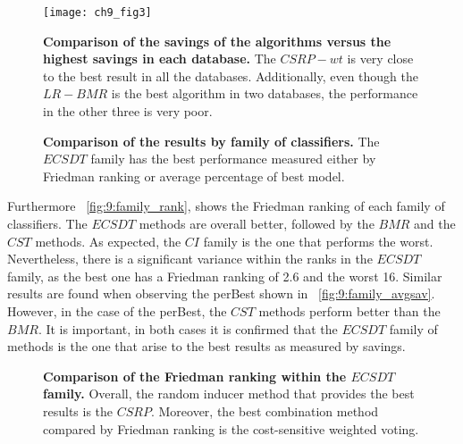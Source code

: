 {  \begin{figure}[t]
    \centering
    \texttt{[image: ch9\_fig3]}
    \caption{\textbf{Comparison of the savings of the algorithms versus the highest savings in 
    each database.} The $CSRP-wt$ is very close to the best result in all the databases. 
    Additionally, even though the $LR-BMR$ is the best algorithm in two databases, the performance 
    in the other three is very poor.}
    \label{fig:9:comparison_best}
  \end{figure} 

  
\begin{figure}[!t]
  \centering
  \hfil
  \caption{\textbf{Comparison of the results by family of classifiers.} The $ECSDT$ family has the 
  best performance measured either by Friedman ranking or average percentage of best model.}
  \label{fig:9:comparison_family}
\end{figure}

  Furthermore \figurename{~\ref{fig:9:family_rank}}, shows the Friedman ranking of each family of 
  classifiers. The $ECSDT$ methods are overall better, followed by the $BMR$ and the $CST$ methods. 
  As expected, the $CI$ family is the one that performs the worst. Nevertheless, there is 
  a significant variance within the ranks in the $ECSDT$ family, as the best one has a Friedman 
  ranking of 2.6 and the worst 16. Similar results are found when observing the perBest shown in 
  \figurename{~\ref{fig:9:family_avgsav}}. However, in the case of the perBest, the $CST$ methods 
  perform better than the $BMR$. It is important, in both cases it is confirmed that the $ECSDT$ 
  family of methods is the one that arise to the best results as measured by savings.

 \begin{figure}[!t]
  \centering
  \hfil
  \caption{\textbf{Comparison of the Friedman ranking within the $ECSDT$ family.} Overall, the 
  random inducer method that provides the best results is the $CSRP$. Moreover, the best 
  combination method compared by Friedman ranking is the cost-sensitive weighted voting.}
  \label{fig:9:rank_ecsdt}
\end{figure}
  
}
